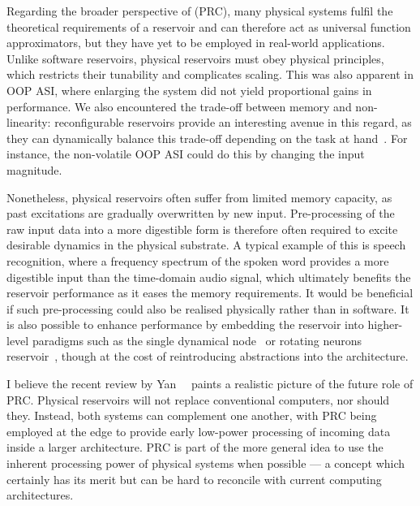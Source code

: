 Regarding the broader perspective of  (PRC), many physical systems fulfil the theoretical requirements of a reservoir and can therefore act as universal function approximators, but they have yet to be employed in real-world applications.
Unlike software reservoirs, physical reservoirs must obey physical principles, which restricts their tunability and complicates scaling.
This was also apparent in OOP ASI, where enlarging the system did not yield proportional gains in performance.
We also encountered the trade-off between memory and non-linearity: reconfigurable reservoirs provide an interesting avenue in this regard, as they can dynamically balance this trade-off depending on the task at hand~\cite{gartside2022reconfigurable}.
For instance, the non-volatile OOP ASI could do this by changing the input magnitude. \par
Nonetheless, physical reservoirs often suffer from limited memory capacity, as past excitations are gradually overwritten by new input.
Pre-processing of the raw input data into a more digestible form is therefore often required to excite desirable dynamics in the physical substrate.
A typical example of this is speech recognition, where a frequency spectrum of the spoken word provides a more digestible input than the time-domain audio signal, which ultimately benefits the reservoir performance as it eases the memory requirements.
It would be beneficial if such pre-processing could also be realised physically rather than in software.
It is also possible to enhance performance by embedding the reservoir into higher-level paradigms such as the single dynamical node~\cite{appeltant2011information} or rotating neurons reservoir~\cite{RotatingNeuronsRC}, though at the cost of reintroducing abstractions into the architecture. \par
I believe the recent review by Yan~\etal{}~\cite{ChallengesFutureRC} paints a realistic picture of the future role of PRC.
Physical reservoirs will not replace conventional computers, nor should they.
Instead, both systems can complement one another, with PRC being employed at the edge to provide early low-power processing of incoming data inside a larger architecture.
PRC is part of the more general idea to use the inherent processing power of physical systems when possible --- a concept which certainly has its merit but can be hard to reconcile with current computing architectures.

